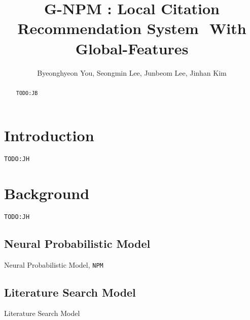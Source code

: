 \documentclass{llncs}
\newcommand{\npm}{\texttt{NPM}\xspace}
\newcommand{\todo}[1]{\texttt{\color{red}TODO:#1}}
\begin{document}
\title{G-NPM : Local Citation Recommendation System  With Global-Features}

\author{Byeonghyeon You, Seongmin Lee, Junbeom Lee, Jinhan Kim}


\maketitle

\begin{abstract}
\todo{JB}

\end{abstract}

\section{Introduction}
\label{sec:introduction}
\todo{JH}

\section{Background}
\todo{JH}
\subsection{Neural Probabilistic Model}
Neural Probabilistic Model, \npm ~\cite{Huang:2015:NPM:2886521.2886655}
\subsection{Literature Search Model}
Literature Search Model~\cite{Bethard:2010:ICL:1871437.1871517}
\end{document}
